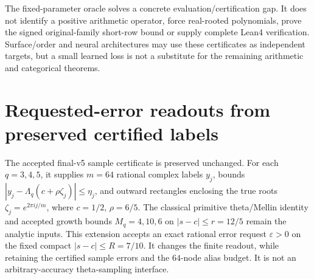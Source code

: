 \documentclass[11pt,oneside,openany]{book}
\theoremstyle{definition}\newtheorem{definition}[theorem]{Definition}
\theoremstyle{remark}\newtheorem{remark}[theorem]{Remark}
\begin{document}
The fixed-parameter oracle solves a concrete evaluation/certification gap.
It does not identify a positive arithmetic operator, force real-rooted
polynomials, prove the signed original-family short-row bound or supply
complete Lean4 verification. Surface/order and neural architectures may use
these certificates as independent targets, but a small learned loss is not a
substitute for the remaining arithmetic and categorical theorems.

\section{Requested-error readouts from preserved certified labels}\label{ar:requested}
The accepted final-v5 sample certificate is preserved unchanged. For each
$q=3,4,5$, it supplies $m=64$ rational complex labels $y_j$, bounds
$|y_j-\Lambda_q(c+\rho\zeta_j)|\le\eta_j$, and outward rectangles enclosing
the true roots $\zeta_j=e^{2\pi i j/m}$, where $c=1/2$, $\rho=6/5$.
The classical primitive theta/Mellin identity and accepted growth bounds
$M_q=4,10,6$ on $|s-c|\le r=12/5$ remain the analytic inputs.
This extension accepts an exact rational error request $\varepsilon>0$ on
the fixed compact $|s-c|\le R=7/10$. It changes the finite readout, while
retaining the certified sample errors and the $64$-node alias budget.
It is not an arbitrary-accuracy theta-sampling interface.
\end{document}
